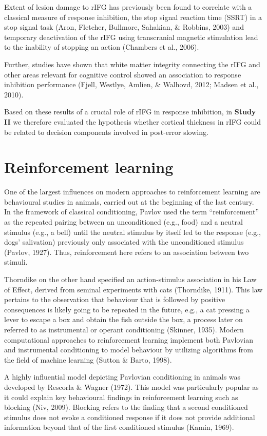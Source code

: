 \documentclass[12pt,openany]{book}
\theoremstyle{definition}
\theoremstyle{definition}
\theoremstyle{definition}
\theoremstyle{remark}
\begin{document}
Extent of lesion damage to rIFG has previously been found to correlate
with a classical measure of response inhibition, the stop signal
reaction time (SSRT) in a stop signal task (Aron, Fletcher, Bullmore,
Sahakian, \& Robbins, 2003) and temporary deactivation of the rIFG using
transcranial magnetic stimulation lead to the inability of stopping an
action (Chambers et al., 2006).

Further, studies have shown that white matter integrity connecting the
rIFG and other areas relevant for cognitive control showed an
association to response inhibition performance (Fjell, Westlye, Amlien,
\& Walhovd, 2012; Madsen et al., 2010).

Based on these results of a crucial role of rIFG in response inhibition,
in \textbf{Study II} we therefore evaluated the hypothesis whether
cortical thickness in rIFG could be related to decision components
involved in post-error slowing.

\section{Reinforcement learning}\label{reinforcement-learning}

One of the largest influences on modern approaches to reinforcement
learning are behavioural studies in animals, carried out at the
beginning of the last century. In the framework of classical
conditioning, Pavlov used the term ``reinforcement'' as the repeated
pairing between an unconditioned (e.g., food) and a neutral stimulus
(e.g., a bell) until the neutral stimulus by itself led to the response
(e.g., dogs' salivation) previously only associated with the
unconditioned stimulus (Pavlov, 1927). Thus, reinforcement here refers
to an association between two stimuli.

Thorndike on the other hand specified an action-stimulus association in
his Law of Effect, derived from seminal experiments with cats
(Thorndike, 1911). This law pertains to the observation that behaviour
that is followed by positive consequences is likely going to be repeated
in the future, e.g., a cat pressing a lever to escape a box and obtain
the fish outside the box, a process later on referred to as instrumental
or operant conditioning (Skinner, 1935). Modern computational approaches
to reinforcement learning implement both Pavlovian and instrumental
conditioning to model behaviour by utilizing algorithms from the field
of machine learning (Sutton \& Barto, 1998).

A highly influential model depicting Pavlovian conditioning in animals
was developed by Rescorla \& Wagner (1972). This model was particularly
popular as it could explain key behavioural findings in reinforcement
learning such as blocking (Niv, 2009). Blocking refers to the finding
that a second conditioned stimulus does not evoke a conditioned response
if it does not provide additional information beyond that of the first
conditioned stimulus (Kamin, 1969).
\end{document}
